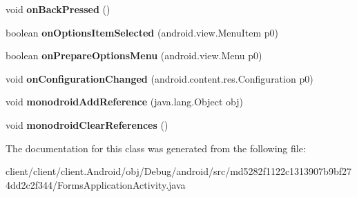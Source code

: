 \begin{DoxyCompactItemize}
\item 
\hypertarget{classmd5282f1122c1313907b9bf274dd2c2f344_1_1FormsApplicationActivity_a381bca17f7ef6328d912fe357e3e9c94}{}void {\bfseries on\+Back\+Pressed} ()\label{classmd5282f1122c1313907b9bf274dd2c2f344_1_1FormsApplicationActivity_a381bca17f7ef6328d912fe357e3e9c94}

\item 
\hypertarget{classmd5282f1122c1313907b9bf274dd2c2f344_1_1FormsApplicationActivity_a11cb71bb298f25fc60c812abe2b6f5de}{}boolean {\bfseries on\+Options\+Item\+Selected} (android.\+view.\+Menu\+Item p0)\label{classmd5282f1122c1313907b9bf274dd2c2f344_1_1FormsApplicationActivity_a11cb71bb298f25fc60c812abe2b6f5de}

\item 
\hypertarget{classmd5282f1122c1313907b9bf274dd2c2f344_1_1FormsApplicationActivity_a0253d6397a4dd702c9718ea0495ad2b1}{}boolean {\bfseries on\+Prepare\+Options\+Menu} (android.\+view.\+Menu p0)\label{classmd5282f1122c1313907b9bf274dd2c2f344_1_1FormsApplicationActivity_a0253d6397a4dd702c9718ea0495ad2b1}

\item 
\hypertarget{classmd5282f1122c1313907b9bf274dd2c2f344_1_1FormsApplicationActivity_a99ade5bd0a3740fc26e7d11fa3222de2}{}void {\bfseries on\+Configuration\+Changed} (android.\+content.\+res.\+Configuration p0)\label{classmd5282f1122c1313907b9bf274dd2c2f344_1_1FormsApplicationActivity_a99ade5bd0a3740fc26e7d11fa3222de2}

\item 
\hypertarget{classmd5282f1122c1313907b9bf274dd2c2f344_1_1FormsApplicationActivity_a1f74037c9cb7182e382c1b94ca8a3251}{}void {\bfseries monodroid\+Add\+Reference} (java.\+lang.\+Object obj)\label{classmd5282f1122c1313907b9bf274dd2c2f344_1_1FormsApplicationActivity_a1f74037c9cb7182e382c1b94ca8a3251}

\item 
\hypertarget{classmd5282f1122c1313907b9bf274dd2c2f344_1_1FormsApplicationActivity_a0c2cbd804bfd1b5c90a8bb8554f135f7}{}void {\bfseries monodroid\+Clear\+References} ()\label{classmd5282f1122c1313907b9bf274dd2c2f344_1_1FormsApplicationActivity_a0c2cbd804bfd1b5c90a8bb8554f135f7}

\end{DoxyCompactItemize}


The documentation for this class was generated from the following file\+:\begin{DoxyCompactItemize}
\item 
client/client/client.\+Android/obj/\+Debug/android/src/md5282f1122c1313907b9bf274dd2c2f344/Forms\+Application\+Activity.\+java\end{DoxyCompactItemize}
